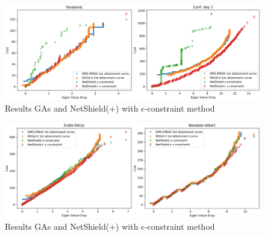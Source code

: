 \documentclass{svproc}
\begin{document}
\begin{figure}
  \centering
    \includegraphics[width=\textwidth]{Images/panconf_attaintment_netshield.png}
  \caption{Results GAs and NetShield(+) with $\epsilon$-constraint method}
  \label{fig:res_panconf}
\end{figure}

\begin{figure}
  \centering
    \includegraphics[width=\textwidth]{Images/Erdos_Bara_V100_attaintment_netshield.png}
  \caption{Results GAs and NetShield(+) with $\epsilon$-constraint method}
  \label{fig:res_erbara}
\end{figure}




\end{document}
